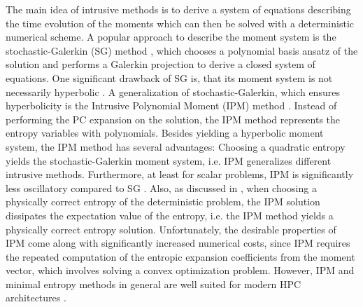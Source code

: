 The main idea of intrusive methods is to derive a system of equations describing the time evolution of the moments which can then be solved with a deterministic numerical scheme. A popular approach to describe the moment system is the stochastic-Galerkin (SG) method \cite{ghanem2003stochastic}, which chooses a polynomial basis ansatz of the solution and performs a Galerkin projection to derive a closed system of equations. One significant drawback of SG is, that its moment system is not necessarily hyperbolic \cite{poette2009uncertainty}. A generalization of stochastic-Galerkin, which ensures hyperbolicity is the Intrusive Polynomial Moment (IPM) method \cite{poette2009uncertainty}. Instead of performing the PC expansion on the solution, the IPM method represents the entropy variables with polynomials. Besides yielding a hyperbolic moment system, the IPM method has several advantages: Choosing a quadratic entropy yields the stochastic-Galerkin moment system, i.e. IPM generalizes different intrusive methods. Furthermore, at least for scalar problems, IPM is significantly less oscillatory compared to SG \cite{kusch2017maximum}. Also, as discussed in \cite{poette2009uncertainty}, when choosing a physically correct entropy of the deterministic problem, the IPM solution dissipates the expectation value of the entropy, i.e. the IPM method yields a physically correct entropy solution. Unfortunately, the desirable properties of IPM come along with significantly increased numerical costs, since IPM requires the repeated computation of the entropic expansion coefficients from the moment vector, which involves solving a convex optimization problem. However, IPM and minimal entropy methods in general are well suited for modern HPC architectures \cite{garrett2015optimization}.

